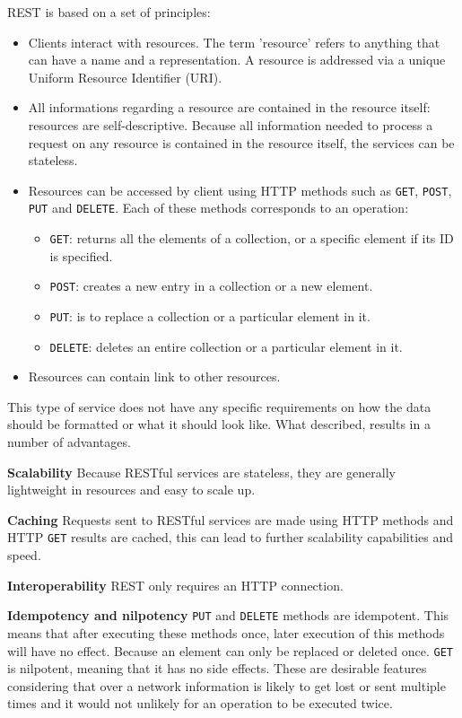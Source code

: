 REST is based on a set of principles:
\begin{itemize}
\item Clients interact with resources. The term 'resource' refers to anything that can have a name and a representation.
      A resource is addressed via a unique Uniform Resource Identifier (URI).
\item All informations regarding a resource are contained in the resource itself: resources are self-descriptive.
      Because all information needed to process a request on any resource is contained in the resource itself,
      the services can be stateless.
\item Resources can be accessed by client using HTTP methods such as \verb|GET|, \verb|POST|, \verb|PUT| and \verb|DELETE|.
      Each of these methods corresponds to an operation:
			\begin{itemize}
				\item \verb|GET|: returns all the elements of a collection, or a specific element if its ID is specified.
				\item \verb|POST|: creates a new entry in a collection or a new element.
				\item \verb|PUT|: is to replace a collection or a particular element in it.
				\item \verb|DELETE|: deletes an entire collection or a particular element in it.
			\end{itemize}
\item Resources can contain link to other resources.
\end{itemize}

This type of service does not have any specific requirements on how the data should be formatted or what it should look like.
What described, results in a number of advantages.

\textbf{Scalability}\newline
Because RESTful services are stateless, they are generally lightweight in resources and easy to scale up.

\textbf{Caching}\newline
Requests sent to RESTful services are made using HTTP methods and HTTP \verb|GET| results are cached, this can
lead to further scalability capabilities and speed.

\textbf{Interoperability}\newline
REST only requires an HTTP connection.

\textbf{Idempotency and nilpotency}\newline
\verb|PUT| and \verb|DELETE| methods are idempotent. 
This means that after executing these methods once, later execution of this methods will have no effect.
Because an element can only be replaced or deleted once.
\verb|GET| is nilpotent, meaning that it has no side effects. These are desirable features considering
that over a network information is likely to get lost or sent multiple times and it would not unlikely for an operation
to be executed twice. %

